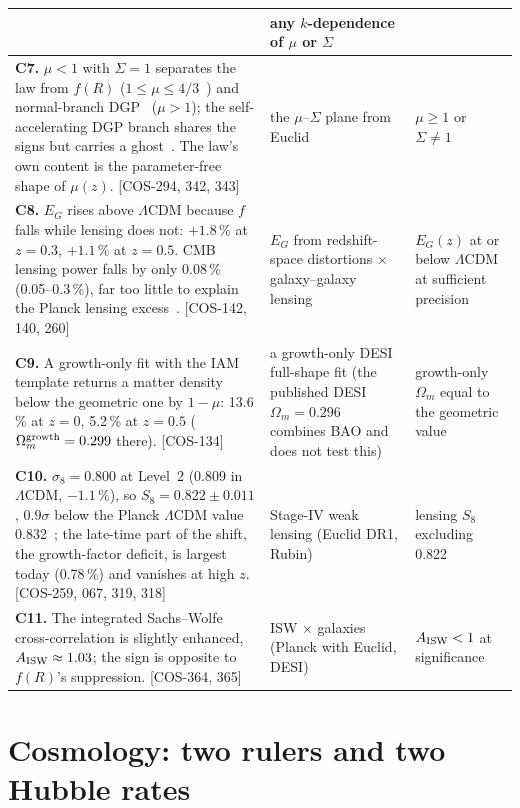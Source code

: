 {\begin{longtable}{@{}>{\raggedright\arraybackslash}p{}>{\raggedright\arraybackslash}p{}>{\raggedright\arraybackslash}p{}@{}}
 & any $k$-dependence of $\mu$ or $\Sigma$ \\ \cmidrule{1-3}
\textbf{C7.} \Spending{} $\mu<1$ with $\Sigma=1$ separates the law from $f(R)$ ($1\le\mu\le4/3$~\cite{PogosianSilvestri2008}) and normal-branch
 DGP~\cite{DGP2000} ($\mu>1$); the self-accelerating DGP branch shares the signs but carries a ghost~\cite{Koyama2007}. The law's own content is the parameter-free shape of $\mu(z)$. [COS-294, 342, 343]
 & the $\mu$--$\Sigma$ plane from Euclid
 & $\mu\ge1$ or $\Sigma\ne1$ \\ \cmidrule{1-3}
\textbf{C8.} \Spending{} $E_G$ rises above $\Lambda$CDM because $f$ falls while lensing does not: $+1.8$\,\% at $z=0.3$, $+1.1$\,\% at $z=0.5$. CMB lensing power falls by only
 0.08\,\% (0.05--0.3\,\%), far too little to explain the Planck lensing excess~\cite{Planck2018VI}. [COS-142, 140, 260]
 & $E_G$ from redshift-space distortions $\times$ galaxy--galaxy lensing
 & $E_G(z)$ at or below $\Lambda$CDM at sufficient precision \\ \cmidrule{1-3}
\textbf{C9.} \Spending{} A growth-only fit with the IAM template returns a matter density below the geometric one by $1-\mu$: 13.6\,\% at $z=0$, 5.2\,\% at
 $z=0.5$ ($\Omega_m^{\rm growth}=0.299$ there). [COS-134]
 & a growth-only DESI full-shape fit (the published DESI $\Omega_m=0.296$ combines BAO and does not test this)
 & growth-only $\Omega_m$ equal to the geometric value \\ \cmidrule{1-3}
\textbf{C10.} \Sprecision{} $\sigma_8=0.800$ at Level~2 (0.809 in $\Lambda$CDM, $-1.1$\,\%), so $S_8=0.822\pm0.011$, $0.9\sigma$ below the Planck
 $\Lambda$CDM value 0.832~\cite{Planck2018VI}; the late-time part of the shift, the growth-factor deficit, is largest today (0.78\,\%) and
 vanishes at high $z$. [COS-259, 067, 319, 318]
 & Stage-IV weak lensing (Euclid DR1, Rubin)
 & lensing $S_8$ excluding 0.822 \\ \cmidrule{1-3}
\textbf{C11.} \Spending{} The integrated Sachs--Wolfe cross-correlation is slightly enhanced, $A_{\rm ISW}\approx1.03$; the sign is opposite to $f(R)$'s suppression.
 [COS-364, 365]
 & ISW $\times$ galaxies (Planck with Euclid, DESI)
 & $A_{\rm ISW}<1$ at significance \\
\bottomrule
\end{longtable}}

\section{Cosmology: two rulers and two Hubble rates}

